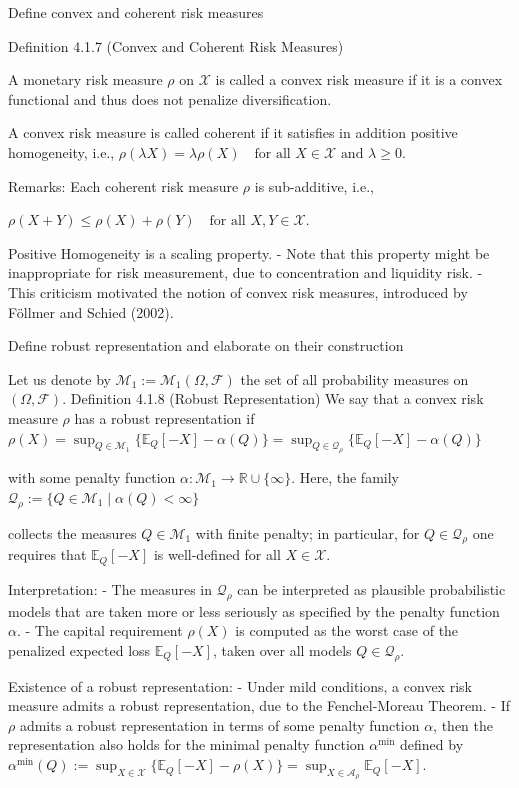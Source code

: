 {Define convex and coherent risk measures

Definition 4.1.7 (Convex and Coherent Risk Measures)

A monetary risk measure \(\rho\) on \(\mathcal{X}\) is called a convex risk measure 
if it is a convex functional and thus does not penalize diversification.

A convex risk measure is called coherent if it satisfies in addition positive homogeneity, i.e.,
\(
\rho(\lambda X) = \lambda \rho(X) \quad \text{for all } X \in \mathcal{X} \text{ and } \lambda \geq 0.
\)

Remarks:
Each coherent risk measure \(\rho\) is sub-additive, i.e.,

\(
\rho(X + Y) \leq \rho(X) + \rho(Y) \quad \text{for all } X, Y \in \mathcal{X}.
\)

Positive Homogeneity is a scaling property.
- Note that this property might be inappropriate for risk measurement, due to concentration and liquidity risk.
- This criticism motivated the notion of convex risk measures, introduced by Föllmer and Schied (2002).

Define robust representation and elaborate on their construction

Let us denote by \(\mathcal{M}_1 := \mathcal{M}_1(\Omega, \mathcal{F})\) the set of all probability measures on \((\Omega, \mathcal{F})\).
Definition 4.1.8 (Robust Representation)
We say that a convex risk measure \(\rho\) has a robust representation if
\(
\rho(X) = \sup_{Q \in \mathcal{M}_1} \{ \mathbb{E}_Q[-X] - \alpha(Q) \} = \sup_{Q \in \mathcal{Q}_\rho} \{ \mathbb{E}_Q[-X] - \alpha(Q) \}
\)

with some penalty function \(\alpha : \mathcal{M}_1 \to \mathbb{R} \cup \{\infty\}\). Here, the family
\(
\mathcal{Q}_\rho := \{ Q \in \mathcal{M}_1 \mid \alpha(Q) < \infty \}
\)

collects the measures \(Q \in \mathcal{M}_1\) with finite penalty; 
in particular, for \(Q \in \mathcal{Q}_\rho\) one requires that \(\mathbb{E}_Q[-X]\) is well-defined for all \(X \in \mathcal{X}\).

Interpretation:
- The measures in \(\mathcal{Q}_\rho\) can be interpreted as plausible probabilistic models that are taken more or less seriously 
  as specified by the penalty function \(\alpha\).
- The capital requirement \(\rho(X)\) is computed as the worst case of the penalized expected loss \(\mathbb{E}_Q[-X]\), 
  taken over all models \(Q \in \mathcal{Q}_\rho\).

Existence of a robust representation:  
- Under mild conditions, a convex risk measure admits a robust representation, due to the Fenchel-Moreau Theorem.  
- If \(\rho\) admits a robust representation in terms of some penalty function \(\alpha\), 
  then the representation also holds for the minimal penalty function \(\alpha^{\text{min}}\) defined by  
\(
\alpha^{\text{min}}(Q) := \sup_{X \in \mathcal{X}} \{ \mathbb{E}_Q[-X] - \rho(X) \} = \sup_{X \in \mathcal{A}_\rho} \mathbb{E}_Q[-X].
\)

}
